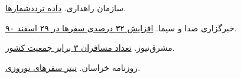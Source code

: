 \documentclass[a4paper, 12pt]{article}
\begin{document}
\begin{thebibliography}{9}
سازمان راهداری.
\href{https://141.ir/}{داده ترددشمارها}.

    خبرگزاری صدا و سیما. 
    \href{https://www.iribnews.ir/fa/news/4498}{افزایش ۳۲ درصدی سفرها در ۲۹ اسفند ۹۰}.
    
    مشرق‌نیوز. 
    \href{https://www.mashreghnews.ir/news/109287}{تعداد مسافران ۳ برابر جمعیت کشور}.
    
    روزنامه خراسان. 
    \href{https://www.khorasannews.com/Newspaper/Page/18087/1/378855/0}{تیتر سفرهای نوروزی}.
    
\end{thebibliography}

    
\end{document}
